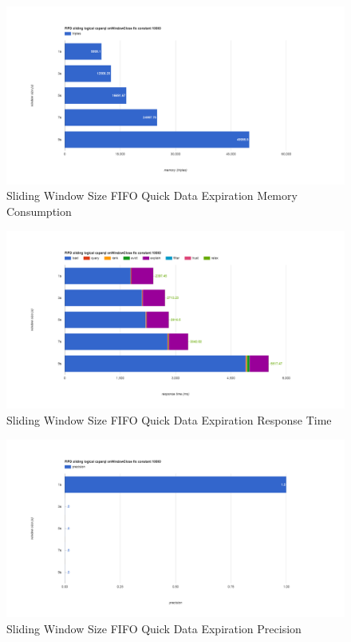 \begin{figure}[!htbp]
    \centering
    \includegraphics[width=\textwidth]{img/app3-slide-ws-fifo-quick-m.png}
    \caption{Sliding Window Size FIFO Quick Data Expiration Memory Consumption}
\end{figure}
\begin{figure}[!htbp]
    \centering
    \includegraphics[width=\textwidth]{img/app3-slide-ws-fifo-quick-r.png}
    \caption{Sliding Window Size FIFO Quick Data Expiration Response Time}
\end{figure}
\begin{figure}[!htbp]
    \centering
    \includegraphics[width=\textwidth]{img/app3-slide-ws-fifo-quick-p.png}
    \caption{Sliding Window Size FIFO Quick Data Expiration Precision}
\end{figure}
